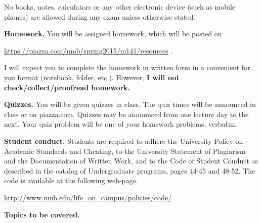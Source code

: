 \documentclass{article}
\begin{document}
No books, notes, calculators or any other electronic device (such as mobile phones) are allowed during any exam unless otherwise stated.

\medskip
\noindent \textbf{Homework.} You will be assigned homework, which will be posted on

\url{https://piazza.com/umb/spring2015/m141/resources} \quad \quad \quad .

\noindent I will expect you to complete the homework in written form in a convenient for you format (notebook, folder, etc.). However, \textbf{I will not check/collect/proofread homework.} 
 
\medskip
\noindent \textbf{Quizzes.} You will be given quizzes in class. The quiz times will be announced in class or on piazza.com. Quizzes may be announced from one lecture day to the next. Your quiz problem will be one of your homework problems, verbatim. 

\medskip
\noindent \textbf{Student conduct.} Students  are required to adhere the University Policy on Academic Standards and Cheating, to the University Statement of Plagiarism and the Documentation of Written Work, and to the Code of Student Conduct as described in the catalog of Undergraduate programs, pages 44-45 and 48-52. The code is available at the following web-page.

\noindent\url{http://www.umb.edu/life_on_campus/policies/code/}

\medskip
\noindent \textbf{Topics to be covered.} 
\end{document}
